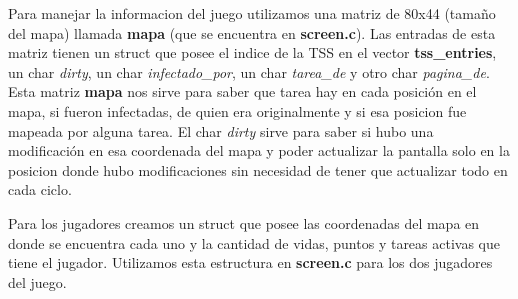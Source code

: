 
Para manejar la informacion del juego utilizamos una matriz de 80x44 (tamaño del mapa) llamada \textbf{mapa} (que se encuentra en \textbf{screen.c}). Las entradas de esta matriz tienen un struct que posee el indice de la TSS en el vector \textbf{tss_entries}, un char \textit{dirty}, un char \textit{infectado_por}, un char \textit{tarea_de} y otro char \textit{pagina_de}.
Esta matriz \textbf{mapa} nos sirve para saber que tarea hay en cada posición en el mapa, si fueron infectadas, de quien era originalmente y si esa posicion fue mapeada por alguna tarea. El char \textit{dirty} sirve para saber si hubo una modificación en esa coordenada del mapa y poder actualizar la pantalla solo en la posicion donde hubo modificaciones sin necesidad de tener que actualizar todo en cada ciclo.

Para los jugadores creamos un struct que posee las coordenadas del mapa en donde se encuentra cada uno y la cantidad de vidas, puntos y tareas activas que tiene el jugador. Utilizamos esta estructura en \textbf{screen.c} para los dos jugadores del juego.
